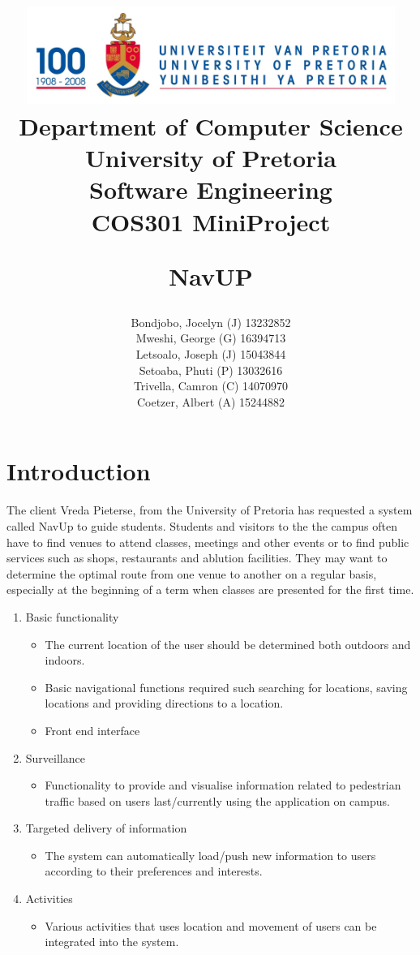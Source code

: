\documentclass[a4paper,10pt]{article}
\title{\includegraphics[width=12cm]{Eeufeeslogo.jpg} \\
       Department of Computer Science \\
       University of Pretoria \\
       \vspace{0.5cm}
       Software Engineering\\
       COS301 MiniProject \\
       \vspace{0.5cm}
       \begin{large}NavUP\end{large}
}
\date{}
\author{Bondjobo, Jocelyn (J) 13232852 			\\
		Mweshi, George (G)		16394713		\\
		Letsoalo, Joseph (J)	15043844		\\
		Setoaba, Phuti (P)		13032616		\\
		Trivella, Camron (C)	14070970		\\
		Coetzer, Albert (A)		15244882		\\
}
\begin{document}
\maketitle
\thispagestyle{empty}
\clearpage

\newpage
{}
\thispagestyle{empty}
\tableofcontents
\clearpage

\newpage
{}

\section{Introduction}
The client Vreda Pieterse, from the University of Pretoria has requested a system called NavUp to guide students. Students and visitors to the the campus often have to find venues to attend classes, meetings and other events or to find public services such as shops, restaurants and ablution facilities. They may want to determine the optimal route from one venue to another on a regular basis, especially at the beginning of a term when classes are presented for the first time. \\

\begin{enumerate}
\item Basic functionality
	\begin{itemize}
	\item The current location of the user should be determined both outdoors and indoors.
	\item Basic navigational functions required such searching for locations, saving locations and providing directions to a location.
	\item Front end interface
	\end{itemize}
\item Surveillance
	\begin{itemize}
	\item Functionality to provide and visualise information related to pedestrian traffic based on users last/currently using the application on campus.
	\end{itemize}
\item Targeted delivery of information
	\begin{itemize}
	\item The system can automatically load/push new information to users according to their preferences and interests.
	\end{itemize}
\item Activities
	\begin{itemize}
	\item Various activities that uses location and movement of users can be integrated into the system.
	\end{itemize}
\end{enumerate}
\end{document}
